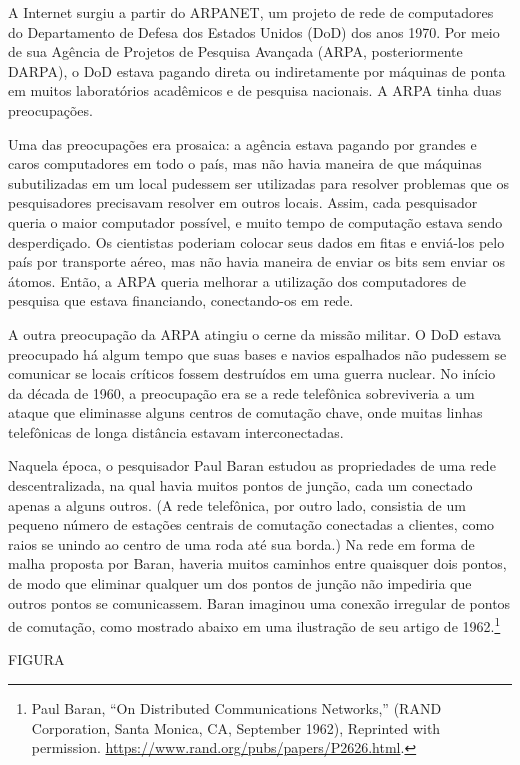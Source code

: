 A Internet surgiu a partir do ARPANET, um projeto de rede de computadores do
Departamento de Defesa dos Estados Unidos (DoD) dos anos 1970. Por meio de sua
Agência de Projetos de Pesquisa Avançada (ARPA, posteriormente DARPA), o DoD estava
pagando direta ou indiretamente por máquinas de ponta em muitos laboratórios
acadêmicos e de pesquisa nacionais. A ARPA tinha duas preocupações.

Uma das preocupações era prosaica: a agência estava pagando por grandes e caros
computadores em todo o país, mas não havia maneira de que máquinas subutilizadas em
um local pudessem ser utilizadas para resolver problemas que os pesquisadores
precisavam resolver em outros locais. Assim, cada pesquisador queria o maior
computador possível, e muito tempo de computação estava sendo desperdiçado. Os
cientistas poderiam colocar seus dados em fitas e enviá-los pelo país por transporte
aéreo, mas não havia maneira de enviar os bits sem enviar os átomos. Então, a ARPA
queria melhorar a utilização dos computadores de pesquisa que estava financiando,
conectando-os em rede.

A outra preocupação da ARPA atingiu o cerne da missão militar. O DoD estava preocupado
há algum tempo que suas bases e navios espalhados não pudessem se comunicar se locais
críticos fossem destruídos em uma guerra nuclear. No início da década de 1960, a
preocupação era se a rede telefônica sobreviveria a um ataque que eliminasse alguns
centros de comutação chave, onde muitas linhas telefônicas de longa distância estavam
interconectadas.

Naquela época, o pesquisador Paul Baran estudou as propriedades de uma rede
descentralizada, na qual havia muitos pontos de junção, cada um conectado apenas a
alguns outros. (A rede telefônica, por outro lado, consistia de um pequeno número de
estações centrais de comutação conectadas a clientes, como raios se unindo ao centro de
uma roda até sua borda.) Na rede em forma de malha proposta por Baran, haveria muitos
caminhos entre quaisquer dois pontos, de modo que eliminar qualquer um dos pontos de
junção não impediria que outros pontos se comunicassem. Baran imaginou uma conexão
irregular de pontos de comutação, como mostrado abaixo em uma ilustração de seu artigo
de 1962.\footnote{Paul Baran, ``On Distributed Communications Networks,'' (RAND Corporation,
Santa Monica, CA, September 1962), Reprinted with permission.
\url{https://www.rand.org/pubs/papers/P2626.html}.}

FIGURA\\

